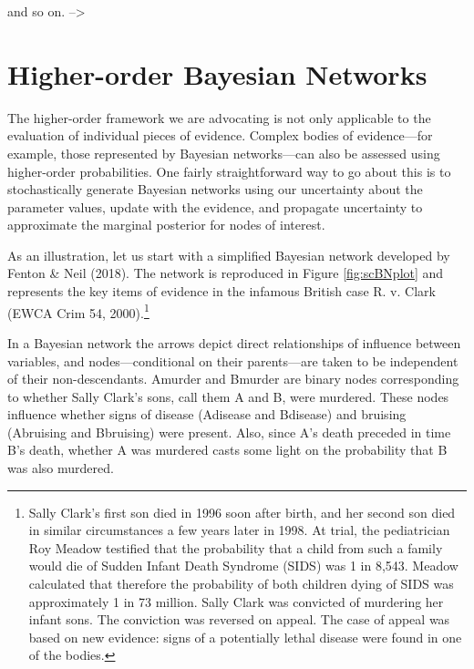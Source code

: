 \documentclass[
  10pt,
  dvipsnames,enabledeprecatedfontcommands]{scrartcl}
\begin{document}
and so on. --\textgreater{}

\section{Higher-order Bayesian
Networks}\label{higher-order-bayesian-networks}

The higher-order framework we are advocating is not only applicable to
the evaluation of individual pieces of evidence. Complex bodies of
evidence---for example, those represented by Bayesian networks---can
also be assessed using higher-order probabilities. One fairly
straightforward way to go about this is to stochastically generate
Bayesian networks using our uncertainty about the parameter values,
update with the evidence, and propagate uncertainty to approximate the
marginal posterior for nodes of interest.

As an illustration, let us start with a simplified Bayesian network
developed by Fenton \& Neil (2018). The network is reproduced in Figure
\ref{fig:scBNplot} and represents the key items of evidence in the
infamous British case R. v. Clark (EWCA Crim 54, 2000).\footnote{Sally
  Clark's first son died in 1996 soon after birth, and her second son
  died in similar circumstances a few years later in 1998. At trial, the
  pediatrician Roy Meadow testified that the probability that a child
  from such a family would die of Sudden Infant Death Syndrome (SIDS)
  was 1 in 8,543. Meadow calculated that therefore the probability of
  both children dying of SIDS was approximately 1 in 73 million. Sally
  Clark was convicted of murdering her infant sons. The conviction was
  reversed on appeal. The case of appeal was based on new evidence:
  signs of a potentially lethal disease were found in one of the bodies.}

In a Bayesian network the arrows depict direct relationships of
influence between variables, and nodes---conditional on their
parents---are taken to be independent of their non-descendants.
\textsf{Amurder} and \textsf{Bmurder} are binary nodes corresponding to
whether Sally Clark's sons, call them A and B, were murdered. These
nodes influence whether signs of disease (\textsf{Adisease} and
\textsf{Bdisease}) and bruising (\textsf{Abruising} and
\textsf{Bbruising}) were present. Also, since A's death preceded in time
B's death, whether A was murdered casts some light on the probability
that B was also murdered.
\end{document}
